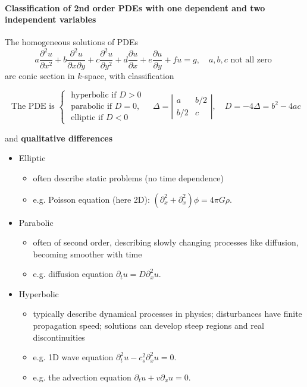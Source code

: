 \paragraph*{Classification of 2nd order PDEs with one dependent and two independent variables}
The homogeneous solutions of PDEs 
\begin{equation}
    a \frac{\partial^2 u}{\partial x^2}+b \frac{\partial^2 u}{\partial x \partial y}+c \frac{\partial^2 u}{\partial y^2}+d \frac{\partial u}{\partial x}+e \frac{\partial u}{\partial y}+f u=g, \quad a, b, c \text { not all zero }
\end{equation}
are conic section in $k$-space, with classification

\begin{equation}
    \text { The PDE is }\left\{\begin{array}{c}
    \text { hyperbolic if } D>0 \\
    \text { parabolic if } D=0, \\
    \text { elliptic if } D<0
    \end{array} \quad \Delta=\left|\begin{array}{cc}
    a & b / 2 \\
    b / 2 & c
    \end{array}\right|, \quad D=-4 \Delta=b^2-4 a c\right.
\end{equation}

and \textbf{qualitative differences}

\begin{itemize}
    \item \textcolor{blue1}{Elliptic}
    \begin{itemize}
        \item often describe static problems (no time dependence)
        \item e.g. Poisson equation (here 2D): $(\partial_x^2 + \partial_x^2) \phi = 4\pi G \rho$.
    \end{itemize}
    \item \textcolor{blue1}{Parabolic}
    \begin{itemize}
        \item often of second order, describing slowly changing processes like diffusion, becoming smoother with time
        \item e.g. diffusion equation $\partial_t u = D \partial_x^2 u$.
    \end{itemize}
    \item \textcolor{blue1}{Hyperbolic}
    \begin{itemize}
        \item typically describe dynamical processes in physics; disturbances have finite propagation speed; solutions can develop steep regions and real discontinuities
        \item e.g. 1D wave equation $\partial_t^2 u - c_s^2 \partial_x^2 u = 0$.
        \item e.g. the advection equation $\partial_t u + v \partial_x u = 0$.
    \end{itemize}
\end{itemize}

